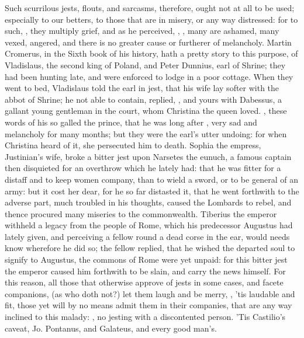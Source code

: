 Such scurrilous jests, flouts, and sarcasms, therefore, ought not at all to be
used; especially to our betters, to those that are in misery, or any way
distressed: for to such, , they multiply grief,
and as he perceived, , \etc{}, many are ashamed, many vexed, angered, and there is no
greater cause or furtherer of melancholy. Martin Cromerus, in the Sixth book of
his history, hath a pretty story to this purpose, of Vladislaus, the second
king of Poland, and Peter Dunnius, earl of Shrine; they had been hunting late,
and were enforced to lodge in a poor cottage. When they went to bed, Vladislaus
told the earl in jest, that his wife lay softer with the abbot of Shrine; he
not able to contain, replied, , and yours with Dabessus,
a gallant young gentleman in the court, whom Christina the queen loved.
, these words of his so galled the
prince, that he was long after , very sad and
melancholy for many months; but they were the earl's utter undoing: for when
Christina heard of it, she persecuted him to death. Sophia the empress,
Justinian's wife, broke a bitter jest upon Narsetes the eunuch, a famous
captain then disquieted for an overthrow which he lately had: that he was
fitter for a distaff and to keep women company, than to wield a sword, or to be
general of an army: but it cost her dear, for he so far distasted it, that he
went forthwith to the adverse part, much troubled in his thoughts, caused the
Lombards to rebel, and thence procured many miseries to the commonwealth.
Tiberius the emperor withheld a legacy from the people of Rome, which his
predecessor Augustus had lately given, and perceiving a fellow round a dead
corse in the ear, would needs know wherefore he did so; the fellow replied,
that he wished the departed soul to signify to Augustus, the commons of Rome
were yet unpaid: for this bitter jest the emperor caused him forthwith to be
slain, and carry the news himself. For this reason, all those that otherwise
approve of jests in some cases, and facete companions, (as who doth not?) let
them laugh and be merry, , 'tis laudable and fit,
those yet will by no means admit them in their companies, that are any way
inclined to this malady: , no jesting with a discontented person. 'Tis Castilio's caveat,
Jo. Pontanus, and Galateus, and every
good man's.

